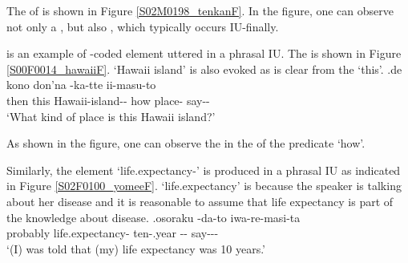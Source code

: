 The  of \Last is shown in Figure \ref{S02M0198_tenkanF}.
In the figure,
one can observe not only a ,
but also ,
which typically occurs IU-finally.

\Next is an example of -coded element uttered in a phrasal IU.
The  is shown in Figure \ref{S00F0014_hawaiiF}.
 `Hawaii island' is also evoked
as is clear from the   `this'.
%
\exg.\label{S00F0014_hawaii}de kono \tp{\dvline}  \tp{\dvline} don'na -ka-tte ii-masu-to \tp{\dvline} \\
		then this {} Hawaii-island-- {} how place- say-- {} \\
		`What kind of place is this Hawaii island?'

As shown in the figure,
one can observe the  in the  of the predicate  `how'.

Similarly,
the  element  `life.expectancy-' is produced in a phrasal IU as indicated in Figure \ref{S02F0100_yomeeF}.
 `life.expectancy' is 
because the speaker is talking about her disease and
it is reasonable to assume that life expectancy is part of the knowledge about disease.
%
\exg.\label{S02F0100_yomee}osoraku {\iub}  {\iub}  {\iub} -da-to {\iub} iwa-re-masi-ta \\
      probably {} life.expectancy- {} ten-.year {} -- {} say--- \\
      `(I) was told that (my) life expectancy was 10 years.'



